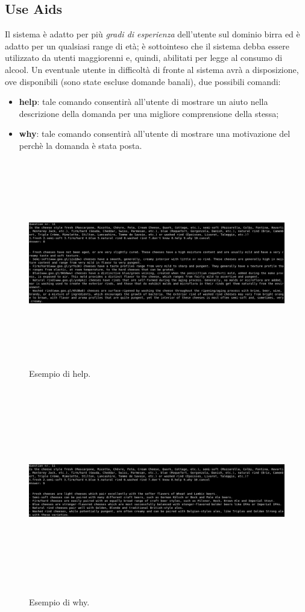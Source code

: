 \documentclass[12pt]{article}
\begin{document}
\subsection{Use Aids}
Il sistema è adatto per più \textit{gradi di esperienza} dell’utente sul dominio birra ed è adatto per un qualsiasi range di età; è sottointeso che il sistema debba essere utilizzato da utenti maggiorenni e, quindi, abilitati per legge al consumo di alcool. Un eventuale utente in difficoltà di fronte al sistema avrà a disposizione, ove disponibili (sono state escluse domande banali), due possibili comandi:
\begin{itemize}
\item \textbf{help}: tale comando consentirà all’utente di mostrare un aiuto nella descrizione della domanda per una migliore comprensione della stessa;
\item \textbf{why}: tale comando consentirà all’utente di mostrare una motivazione del perchè la domanda è stata posta.
\end{itemize}

\begin{figure}[h]
\centering
\includegraphics[width=15cm,height=9cm,keepaspectratio]{img/help.png}
\caption{Esempio di help.}
\end{figure}

\begin{figure}[h]
\centering
\includegraphics[width=15cm,height=9cm,keepaspectratio]{img/why.png}
\caption{Esempio di why.}
\end{figure}
\end{document}
